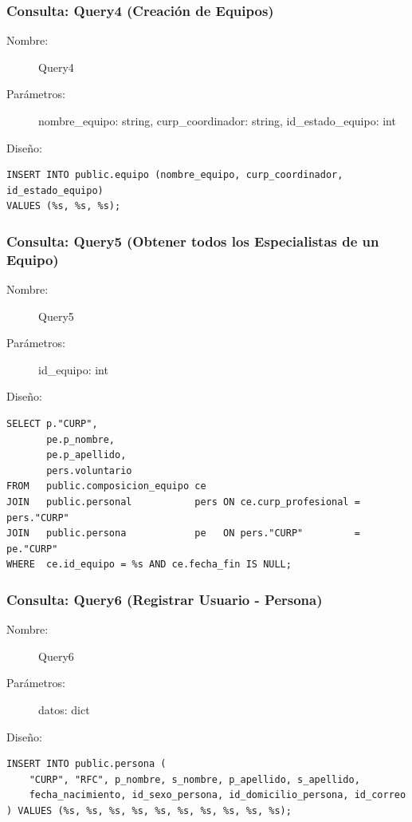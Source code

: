 \subsubsection{Consulta: Query4 (Creación de Equipos)}
\begin{description}
    \item[Nombre:] Query4
    \item[Parámetros:] nombre\_equipo: string, curp\_coordinador: string, id\_estado\_equipo: int
    \item[Diseño:] \cdtEmpty
\end{description}
\begin{verbatim}
INSERT INTO public.equipo (nombre_equipo, curp_coordinador, id_estado_equipo)
VALUES (%s, %s, %s);
\end{verbatim}

\subsubsection{Consulta: Query5 (Obtener todos los Especialistas de un Equipo)}
\begin{description}
    \item[Nombre:] Query5
    \item[Parámetros:] id\_equipo: int
    \item[Diseño:] \cdtEmpty
\end{description}
\begin{verbatim}
SELECT p."CURP",
       pe.p_nombre,
       pe.p_apellido,
       pers.voluntario
FROM   public.composicion_equipo ce
JOIN   public.personal           pers ON ce.curp_profesional = pers."CURP"
JOIN   public.persona            pe   ON pers."CURP"         = pe."CURP"
WHERE  ce.id_equipo = %s AND ce.fecha_fin IS NULL;
\end{verbatim}

\subsubsection{Consulta: Query6 (Registrar Usuario - Persona)}
\begin{description}
    \item[Nombre:] Query6
    \item[Parámetros:] datos: dict
    \item[Diseño:] \cdtEmpty
\end{description}
\begin{verbatim}
INSERT INTO public.persona (
    "CURP", "RFC", p_nombre, s_nombre, p_apellido, s_apellido,
    fecha_nacimiento, id_sexo_persona, id_domicilio_persona, id_correo
) VALUES (%s, %s, %s, %s, %s, %s, %s, %s, %s, %s);
\end{verbatim}

